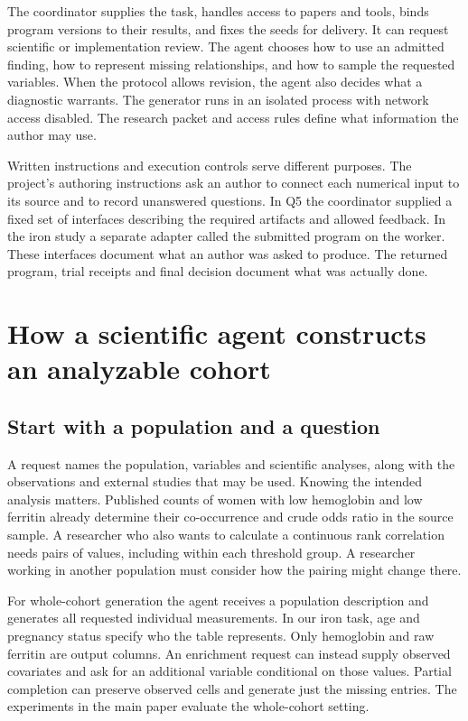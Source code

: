 \documentclass[11pt,letterpaper]{article}
\begin{document}
The coordinator supplies the task, handles access to papers and tools, binds program versions to their results, and fixes the seeds for delivery. It can request scientific or implementation review. The agent chooses how to use an admitted finding, how to represent missing relationships, and how to sample the requested variables. When the protocol allows revision, the agent also decides what a diagnostic warrants. The generator runs in an isolated process with network access disabled. The research packet and access rules define what information the author may use.


Written instructions and execution controls serve different purposes. The project's authoring instructions ask an author to connect each numerical input to its source and to record unanswered questions. In Q5 the coordinator supplied a fixed set of interfaces describing the required artifacts and allowed feedback. In the iron study a separate adapter called the submitted program on the worker. These interfaces document what an author was asked to produce. The returned program, trial receipts and final decision document what was actually done.


\section{How a scientific agent constructs an analyzable cohort}

\subsection{Start with a population and a question}

A request names the population, variables and scientific analyses, along with the observations and external studies that may be used. Knowing the intended analysis matters. Published counts of women with low hemoglobin and low ferritin already determine their co-occurrence and crude odds ratio in the source sample. A researcher who also wants to calculate a continuous rank correlation needs pairs of values, including within each threshold group. A researcher working in another population must consider how the pairing might change there.


For whole-cohort generation the agent receives a population description and generates all requested individual measurements. In our iron task, age and pregnancy status specify who the table represents. Only hemoglobin and raw ferritin are output columns. An enrichment request can instead supply observed covariates and ask for an additional variable conditional on those values. Partial completion can preserve observed cells and generate just the missing entries. The experiments in the main paper evaluate the whole-cohort setting.
\end{document}
